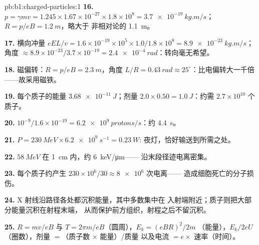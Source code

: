 \begin{solution}{pb:b1:charged-particles:1}
\textbf{16.} $p = \gamma mv = 1.245 \times 1.67\times10^{-27} \times 1.8\times10^8
= \qty{3.7e-19}{kg.m/s}$；$R = p/eB = \qty{1.2}{m}$，略大于
非相对论的 \qty{1.1}{m}。

\textbf{17.} 横向冲量 $eEL/v = 1.6\times10^{-19} \times 10^5 \times
1.0/1.8\times10^8 = \qty{8.9e-23}{kg.m/s}$；角度 $\approx 8.9\times10^{-23}/
3.7\times10^{-19} = \qty{2.4e-4}{rad}$：转向毫无希望。

\textbf{18.} 磁偏转：$R = p/eB = \qty{2.3}{m}$，角度 $L/R = \qty{0.43}{rad}
\approx 25^\circ$：比电偏转大一千倍——故采用磁铁。

\textbf{19.} 每个质子的能量 $\qty{3.68e-11}{J}$；剂量 $2.0 \times 0.50 =
\qty{1.0}{J}$：约需 $2.7\times10^{10}$ 个质子。

\textbf{20.} $10^{-9}/1.6\times10^{-19} = \qty{6.2e9}{protons/s}$：约
\qty{4.4}{s}。

\textbf{21.} $P = \qty{230}{MeV} \times \qty{6.2e9}{s^{-1}} = \qty{0.23}{W}$:
夜灯，恰好输送到所需之处。

\textbf{22.} $\qty{58}{MeV}$ 在 \qty{1}{cm} 内，约 \qty{6}{keV/\micro m}——
沿末段径迹电离密集。

\textbf{23.} 每个质子约产生 $230\times10^6/30 \approx \num{8e6}$ 次电离——
造成细胞死亡的分子损伤。

\textbf{24.} X 射线沿路径各处都沉积能量，其中多数集中在
入射端附近；质子则把大部分能量沉积在射程末端，
从而保护前方组织，射程之后不留沉积。

\textbf{25.} $R = mv/eB$ 与 $T = 2\pi m/eB$（圆周），$E_k = (eBR)^2/2m$
（能量），$E_k/2eU$（圈数），剂量 $=$（质子数 $\times$ 能量）/质量
以及电流 $= e \times$ 速率（时间）。
\end{solution}
